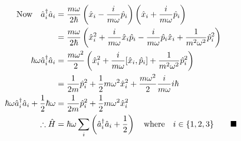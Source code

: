 \documentclass{amsart}
\begin{document}
\begin{align*}
    \qq{Now}\hat{a}^\dagger_i\hat{a}_i&=\frac{m\omega}{2\hbar}\left(\hat{x}_i-\frac{i}{m\omega}\hat{p}_i\right)\left(\hat{x}_i+\frac{i}{m\omega}\hat{p}_i\right)\\
    &=\frac{m\omega}{2\hbar}\left(\hat{x}^2_i+\frac{i}{m\omega}\hat{x}_i\hat{p}_i-\frac{i}{m\omega}\hat{p}_i\hat{x}_i+\frac{1}{m^2\omega^2}\hat{p}^2_i\right)\\
    \hbar\omega\hat{a}^\dagger_i\hat{a}_i&=\frac{m\omega^2}{2}\left(\hat{x}^2_i+\frac{i}{m\omega}[\hat{x}_i,\hat{p}_i]+\frac{1}{m^2\omega^2}\hat{p}^2_i\right)\\
    &=\frac{1}{2m}\hat{p}^2_i+\frac{1}{2}m\omega^2\hat{x}^2_i+\frac{m\omega^2}{2}\frac{i}{m\omega}i\hbar\\
    \hbar\omega\hat{a}^\dagger_i\hat{a}_i+\frac{1}{2}\hbar\omega&=\frac{1}{2m}\hat{p}^2_i+\frac{1}{2}m\omega^2\hat{x}^2_i\\
    \therefore\hat{H}&=\hbar\omega\sum_i\left(\hat{a}^\dagger_i\hat{a}_i+\frac{1}{2}\right)\qq{where}i\in\{1,2,3\}\qquad\blacksquare
\end{align*}
\end{document}
